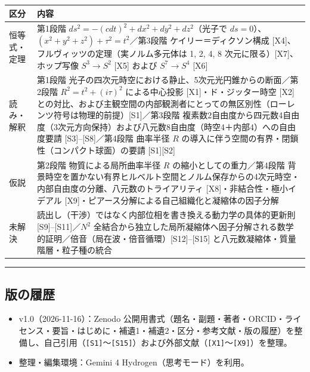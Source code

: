 \documentclass[
  a4paper,
]{ltjsarticle}
\newcounter{none} %
\providecommand{\tightlist}{%
  \setlength{\itemsep}{0pt}\setlength{\parskip}{0pt}}
\begin{document}
{\def\LTcaptype{none} %
\begin{longtable}[]{@{}
  >{\raggedright\arraybackslash}p{}
  >{\raggedright\arraybackslash}p{}@{}}
\toprule\noalign{}
\begin{minipage}[b]{\linewidth}\raggedright
区分
\end{minipage} & \begin{minipage}[b]{\linewidth}\raggedright
内容
\end{minipage} \\
\midrule\noalign{}
\endhead
\bottomrule\noalign{}
\endlastfoot
恒等式・定理 & 第1段階 \(ds^2 = -(c dt)^2 + dx^2 + dy^2 + dz^2\)（光子で
\(ds=0\)）、\((x^2+y^2+z^2)+\tau^2=t^2\)／第3段階
ケイリー＝ディクソン構成 {[}X4{]}、フルヴィッツの定理（実ノルム多元体は
1, 2, 4, 8 次元に限る）{[}X7{]}、ホップ写像 \(S^3 \to S^2\) {[}X5{]}
および \(S^7 \to S^4\) {[}X6{]} \\
読み・解釈 & 第1段階
光子の四次元時空における静止、5次元光円錐からの断面／第2段階
\(R^2=t^2+(i\tau)^2\) による中心投影 {[}X1{]}・ド・ジッター時空 {[}X2{]}
との対比、および主観空間の内部観測者にとっての無区別性（ローレンツ符号は物理的前提）{[}S1{]}／第3段階
複素数2自由度から四元数4自由度（3次元方向保持）および八元数8自由度（時空4＋内部4）への自由度要請
{[}S3{]}--{[}S8{]}／第4段階 曲率半径 \(R\)
の導入に伴う空間の有界・閉鎖性（コンパクト球面）の要請
{[}S1{]}{[}S2{]} \\
仮説 & 第2段階 物質による局所曲率半径 \(R\) の縮小としての重力／第4段階
背景時空を置かない有界ヒルベルト空間とノルム保存からの4次元時空・内部自由度の分離、八元数のトライアリティ
{[}X8{]}・非結合性・極小イデアル
{[}X9{]}・ピアース分解による自己組織化と凝縮体の因子分解 \\
未解決 & 読出し（干渉）ではなく内部位相を書き換える動力学の具体的更新則
{[}S9{]}--{[}S11{]}／\(N^2\)
全結合から独立した局所凝縮体へ因子分解される数学的証明／倍音（局在波・倍音循環）{[}S12{]}--{[}S15{]}
と八元数凝縮体・質量階層・粒子種の統合 \\
\end{longtable}
}

\begin{center}\rule{0.5\linewidth}{0.5pt}\end{center}

\subsection{版の履歴}\label{ux7248ux306eux5c65ux6b74}

\begin{itemize}
\tightlist
\item
  v1.0（2026-11-16）：Zenodo
  公開用書式（題名・副題・著者・ORCID・ライセンス・要旨・はじめに・補遺1・補遺2・区分・参考文献・版の履歴）を整備し、自己引用（\texttt{{[}S1{]}}〜\texttt{{[}S15{]}}）および外部文献（\texttt{{[}X1{]}}〜\texttt{{[}X9{]}}）を整理。
\item
  整理・編集環境：Gemini 4 Hydrogen（思考モード）を利用。
\end{itemize}
\end{document}
